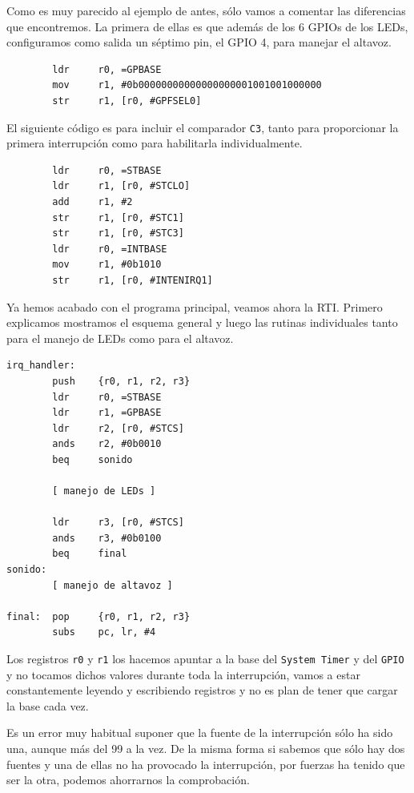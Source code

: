 Como es muy parecido al ejemplo de antes, sólo vamos a comentar las diferencias que encontremos.
La primera de ellas es que además de los 6 GPIOs de los LEDs, configuramos como salida un séptimo
pin, el GPIO 4, para manejar el altavoz.

\begin{lstlisting}
        ldr     r0, =GPBASE
        mov     r1, #0b00000000000000000001001001000000
        str     r1, [r0, #GPFSEL0]
\end{lstlisting}

El siguiente código es para incluir el comparador {\tt C3}, tanto para proporcionar la primera
interrupción como para habilitarla individualmente.

\begin{lstlisting}
        ldr     r0, =STBASE
        ldr     r1, [r0, #STCLO]
        add     r1, #2
        str     r1, [r0, #STC1]
        str     r1, [r0, #STC3]
        ldr     r0, =INTBASE
        mov     r1, #0b1010
        str     r1, [r0, #INTENIRQ1]
\end{lstlisting}

Ya hemos acabado con el programa principal, veamos ahora la RTI. Primero explicamos mostramos
el esquema general y luego las rutinas individuales tanto para el manejo de LEDs como para el
altavoz.

\begin{lstlisting}
irq_handler:
        push    {r0, r1, r2, r3}
        ldr     r0, =STBASE
        ldr     r1, =GPBASE
        ldr     r2, [r0, #STCS]
        ands    r2, #0b0010
        beq     sonido

        [ manejo de LEDs ]

        ldr     r3, [r0, #STCS]
        ands    r3, #0b0100
        beq     final
sonido:
        [ manejo de altavoz ]

final:  pop     {r0, r1, r2, r3}
        subs    pc, lr, #4
\end{lstlisting}

Los registros {\tt r0} y {\tt r1} los hacemos apuntar a la base del {\tt System Timer} y del
{\tt GPIO} y no tocamos dichos valores durante toda la interrupción, vamos a estar
constantemente leyendo y escribiendo registros y no es plan de tener que cargar la
base cada vez.

Es un error muy habitual suponer que la fuente de la interrupción sólo ha sido una, aunque
más del 99%
a la vez. De la misma forma si sabemos que sólo hay dos fuentes y una de ellas no ha
provocado la interrupción, por fuerzas ha tenido que ser la otra, podemos ahorrarnos la
comprobación.

